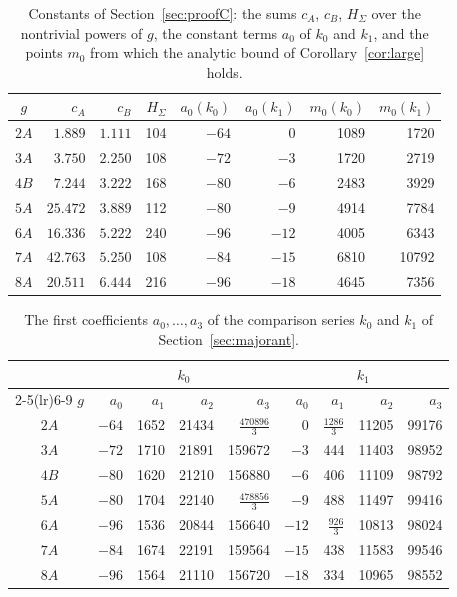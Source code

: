 \documentclass[11pt]{amsart}
\theoremstyle{definition}
\begin{document}
\begin{table}[H]
\centering
\caption{Constants of Section~\ref{sec:proofC}: the sums $c_A$, $c_B$, $H_\Sigma$ over the nontrivial powers of $g$, the constant terms $a_0$ of $k_0$ and $k_1$, and the points $m_0$ from which the analytic bound of Corollary~\ref{cor:large} holds.}
\label{tab:consts}
\renewcommand{\arraystretch}{1.15}
\begin{tabular}{crrrrrrr}
\toprule
$g$ & $c_A$ & $c_B$ & $H_\Sigma$ & $a_0(k_0)$ & $a_0(k_1)$ & $m_0(k_0)$ & $m_0(k_1)$\\
\midrule
$2A$ & $1.889$ & $1.111$ & 104 & $-64$ & $0$ & 1089 & 1720\\
$3A$ & $3.750$ & $2.250$ & 108 & $-72$ & $-3$ & 1720 & 2719\\
$4B$ & $7.244$ & $3.222$ & 168 & $-80$ & $-6$ & 2483 & 3929\\
$5A$ & $25.472$ & $3.889$ & 112 & $-80$ & $-9$ & 4914 & 7784\\
$6A$ & $16.336$ & $5.222$ & 240 & $-96$ & $-12$ & 4005 & 6343\\
$7A$ & $42.763$ & $5.250$ & 108 & $-84$ & $-15$ & 6810 & 10792\\
$8A$ & $20.511$ & $6.444$ & 216 & $-96$ & $-18$ & 4645 & 7356\\
\bottomrule
\end{tabular}
\end{table}

\begin{table}[H]
\centering
\caption{The first coefficients $a_0,\dots,a_3$ of the comparison series $k_0$ and $k_1$ of Section~\ref{sec:majorant}.}
\label{tab:first}
\renewcommand{\arraystretch}{1.15}
\begin{tabular}{crrrrrrrr}
\toprule
& \multicolumn{4}{c}{$k_0$} & \multicolumn{4}{c}{$k_1$}\\
\cmidrule(lr){2-5}\cmidrule(lr){6-9}
$g$ & $a_0$ & $a_1$ & $a_2$ & $a_3$ & $a_0$ & $a_1$ & $a_2$ & $a_3$\\
\midrule
$2A$ & $-64$ & 1652 & 21434 & $\tfrac{470896}3$ & 0 & $\tfrac{1286}3$ & 11205 & 99176\\
$3A$ & $-72$ & 1710 & 21891 & 159672 & $-3$ & 444 & 11403 & 98952\\
$4B$ & $-80$ & 1620 & 21210 & 156880 & $-6$ & 406 & 11109 & 98792\\
$5A$ & $-80$ & 1704 & 22140 & $\tfrac{478856}3$ & $-9$ & 488 & 11497 & 99416\\
$6A$ & $-96$ & 1536 & 20844 & 156640 & $-12$ & $\tfrac{926}3$ & 10813 & 98024\\
$7A$ & $-84$ & 1674 & 22191 & 159564 & $-15$ & 438 & 11583 & 99546\\
$8A$ & $-96$ & 1564 & 21110 & 156720 & $-18$ & 334 & 10965 & 98552\\
\bottomrule
\end{tabular}
\end{table}
\end{document}
